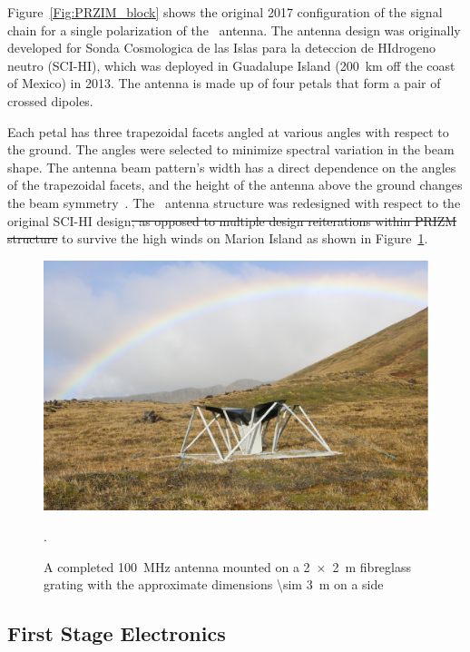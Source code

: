 Figure~\ref{Fig:PRZIM_block} shows the original 2017 configuration of the signal chain for a single polarization of the \prizm\ antenna. The  antenna design was originally developed for Sonda Cosmologica de las Islas para la deteccion de HIdrogeno neutro (SCI-HI), which was deployed in Guadalupe Island (\SI{200}{\kilo \meter} off the coast of Mexico) in 2013. The antenna is made up of four petals that form a pair of crossed dipoles. 

Each petal has three trapezoidal facets angled at various angles with respect to the ground. The angles were selected to minimize spectral variation in the beam shape. The antenna beam pattern's width has a direct dependence on the angles of the trapezoidal facets, and the height of the antenna above the ground changes the beam symmetry~\citep{2014ApJ...782L...9V}.  The \prizm\ antenna structure was redesigned with respect to the original SCI-HI design\st{, as opposed to multiple design reiterations within PRIZM structure} to survive the high winds on Marion Island as shown in Figure~\ref{Fig:tel}.  


\begin{figure}
\centering
\includegraphics[width=\linewidth]{Figures/tel}
\caption{A completed \SI{100}{\mega \hertz} antenna mounted on a \SI{2x2}{\meter} fibreglass grating with the approximate dimensions \SI{\sim 3}{\meter} on a side}.
\label{Fig:tel}
\end{figure}

\subsection{First Stage Electronics}

